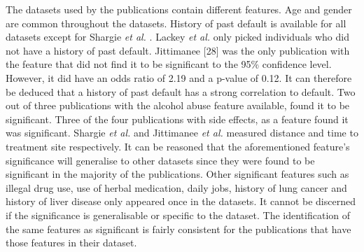 \documentclass{sig-alternate-05-2015}
\begin{document}
The datasets used by the publications contain different features. Age and gender are common throughout the datasets. History of past default is available for all datasets except for Shargie \textit{et al.} \cite{Shargie:10.1371/journal.pmed.0040037}. Lackey \textit{et al.} \cite{Lackey:10356751520150601} only picked individuals who did not have a history of past default. Jittimanee \cite{jittimanee:10.1111/j.1440-172X.2007.00650.x} [28] was the only publication with the feature that did not find it to be significant to the 95\% confidence level. However, it did have an odds ratio of 2.19 and a p-value of 0.12. It can therefore be deduced that a history of past default has a strong correlation to default. Two out of three publications with the alcohol abuse feature available, found it to be significant. Three of the four publications with side effects, as a feature found it was significant. Shargie \textit{et al.} \cite{Shargie:10.1371/journal.pmed.0040037} and Jittimanee \textit{et al.} \cite{jittimanee:10.1111/j.1440-172X.2007.00650.x} measured distance and time to treatment site respectively. It can be reasoned that the aforementioned feature's significance will generalise to other datasets since they were found to be significant in the majority of the publications. Other significant features such as illegal drug use, use of herbal medication, daily jobs, history of lung cancer and history of liver disease only appeared once in the datasets. It cannot be discerned if the significance is generalisable or specific to the dataset. The identification of the same features as significant is fairly consistent for the publications that have those features in their dataset. 
\end{document}
